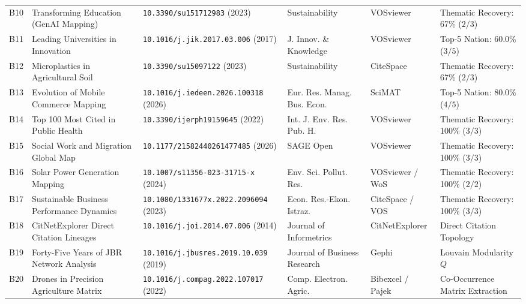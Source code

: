 \begin{table}[t]
{\begin{tabular}{c >{\RaggedRight\arraybackslash}p{4.2cm} >{\RaggedRight\arraybackslash}p{3.6cm} >{\RaggedRight\arraybackslash}p{3.0cm} >{\RaggedRight\arraybackslash}p{2.2cm} >{\RaggedRight\arraybackslash}p{3.4cm}}
B10 & Transforming Education (GenAI Mapping) & {\scriptsize\nolinkurl{10.3390/su151712983}} (2023) & Sustainability & VOSviewer & Thematic Recovery: 67\% ($2/3$) \\
B11 & Leading Universities in Innovation & {\scriptsize\nolinkurl{10.1016/j.jik.2017.03.006}} (2017) & J. Innov. \& Knowledge & VOSviewer & Top-5 Nation: 60.0\% ($3/5$) \\
B12 & Microplastics in Agricultural Soil & {\scriptsize\nolinkurl{10.3390/su15097122}} (2023) & Sustainability & CiteSpace & Thematic Recovery: 67\% ($2/3$) \\
B13 & Evolution of Mobile Commerce Mapping & {\scriptsize\nolinkurl{10.1016/j.iedeen.2026.100318}} (2026) & Eur. Res. Manag. Bus. Econ. & SciMAT & Top-5 Nation: 80.0\% ($4/5$) \\
B14 & Top 100 Most Cited in Public Health & {\scriptsize\nolinkurl{10.3390/ijerph19159645}} (2022) & Int. J. Env. Res. Pub. H. & VOSviewer & Thematic Recovery: 100\% ($3/3$) \\
B15 & Social Work and Migration Global Map & {\scriptsize\nolinkurl{10.1177/21582440261477485}} (2026) & SAGE Open & VOSviewer & Thematic Recovery: 100\% ($3/3$) \\
B16 & Solar Power Generation Mapping & {\scriptsize\nolinkurl{10.1007/s11356-023-31715-x}} (2024) & Env. Sci. Pollut. Res. & VOSviewer / WoS & Thematic Recovery: 100\% ($2/2$) \\
B17 & Sustainable Business Performance Dynamics & {\scriptsize\nolinkurl{10.1080/1331677x.2022.2096094}} (2023) & Econ. Res.-Ekon. Istraz. & CiteSpace / VOS & Thematic Recovery: 100\% ($3/3$) \\
B18 & CitNetExplorer Direct Citation Lineages & {\scriptsize\nolinkurl{10.1016/j.joi.2014.07.006}} (2014) & Journal of Informetrics & CitNetExplorer & Direct Citation Topology \\
B19 & Forty-Five Years of JBR Network Analysis & {\scriptsize\nolinkurl{10.1016/j.jbusres.2019.10.039}} (2019) & Journal of Business Research & Gephi & Louvain Modularity $Q$ \\
B20 & Drones in Precision Agriculture Matrix & {\scriptsize\nolinkurl{10.1016/j.compag.2022.107017}} (2022) & Comp. Electron. Agric. & Bibexcel / Pajek & Co-Occurrence Matrix Extraction \\
\hline
\end{tabular}%
}

\end{table}
